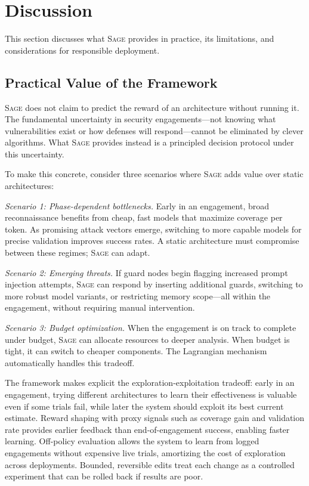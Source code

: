 \documentclass[sigconf,anonymous]{acmart}
\newcommand{\SAGE}{\textsc{Sage}\xspace}
\begin{document}
\section{Discussion}
\label{sec:discussion}

This section discusses what \SAGE provides in practice, its limitations, and considerations for responsible deployment.

\subsection{Practical Value of the Framework}

\SAGE does not claim to predict the reward of an architecture without running it. The fundamental uncertainty in security engagements---not knowing what vulnerabilities exist or how defenses will respond---cannot be eliminated by clever algorithms. What \SAGE provides instead is a principled decision protocol under this uncertainty.

To make this concrete, consider three scenarios where \SAGE adds value over static architectures:

\emph{Scenario 1: Phase-dependent bottlenecks.} Early in an engagement, broad reconnaissance benefits from cheap, fast models that maximize coverage per token. As promising attack vectors emerge, switching to more capable models for precise validation improves success rates. A static architecture must compromise between these regimes; \SAGE can adapt.

\emph{Scenario 2: Emerging threats.} If guard nodes begin flagging increased prompt injection attempts, \SAGE can respond by inserting additional guards, switching to more robust model variants, or restricting memory scope---all within the engagement, without requiring manual intervention.

\emph{Scenario 3: Budget optimization.} When the engagement is on track to complete under budget, \SAGE can allocate resources to deeper analysis. When budget is tight, it can switch to cheaper components. The Lagrangian mechanism automatically handles this tradeoff.

The framework makes explicit the exploration-exploitation tradeoff: early in an engagement, trying different architectures to learn their effectiveness is valuable even if some trials fail, while later the system should exploit its best current estimate. Reward shaping with proxy signals such as coverage gain and validation rate provides earlier feedback than end-of-engagement success, enabling faster learning. Off-policy evaluation allows the system to learn from logged engagements without expensive live trials, amortizing the cost of exploration across deployments. Bounded, reversible edits treat each change as a controlled experiment that can be rolled back if results are poor.
\end{document}
